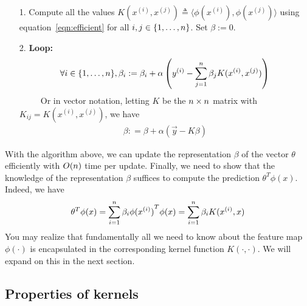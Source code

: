 \documentclass{article}
\begin{document}
\begin{algorithm}
	\begin{itemize}
		\item[1.] Compute all the values $K(x^{(i)}, x^{(j)})\triangleq \langle\phi(x^{(i)}), \phi(x^{(j)})\rangle $ using equation~\eqref{eqn:efficient} for all $i,j \in \{1,\dots, {n}\}$. Set $\beta := 0$. 
		\item[2.] {\bf Loop: }
		\begin{align}
		\forall i\in \{1,\dots, {n}\}, \beta_i : = \beta_i  + \alpha\left({y^{(i)}} - \sum_{j=1}^{{n}} \beta_j K(x^{(i)}, x^{(j)})\right)\label{eqn:algo}
		\end{align}
		~~~~~Or in vector notation, letting $K$ be the ${n}\times {n}$ matrix with $K_{ij} = K(x^{(i)}, x^{(j)})$, we have
		\begin{align}
			\beta: = \beta + \alpha (\vec{y} - K\beta) \nonumber
		\end{align} 
	\end{itemize}
\end{algorithm}

With the algorithm above, we can update the representation $\beta$ of the vector $\theta$ efficiently with $O({n})$ time per update. Finally, we need to show that the knowledge of the representation $\beta$ suffices to compute the prediction $\theta^T \phi(x)$. Indeed, we have %
\begin{align}
\theta^T\phi(x) = \sum_{i=1}^{{n}} \beta_i {\phi(x^{(i)}) }^T\phi(x) = \sum_{i=1}^{{n}} \beta_i K(x^{(i)}, x)\label{eqn:test}
\end{align}
You may realize that fundamentally all we need to know about the feature map $\phi(\cdot)$ is encapsulated in the corresponding kernel function $K(\cdot, \cdot)$. We will expand on this in the next section. 



\subsection{Properties of kernels}

\end{document}
